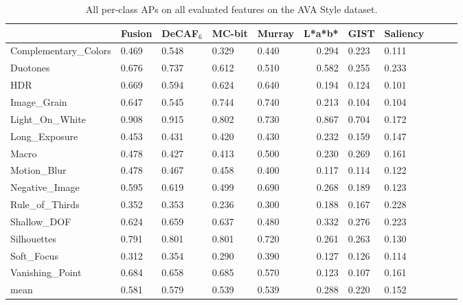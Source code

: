 \begin{table}[ht!]
\caption{
    All per-class APs on all evaluated features on the AVA Style dataset.
}\label{tab:ava_style_ap_table}
\vspace{1em}
\centering
\small{
\begin{tabular}{lllllrlllll}
\toprule
{}                    & Fusion & DeCAF$_6$ & MC-bit & Murray & L*a*b* & GIST  & Saliency \\
\midrule
Complementary\_Colors & 0.469  & 0.548     & 0.329  & 0.440  & 0.294  & 0.223 & 0.111 \\
Duotones              & 0.676  & 0.737     & 0.612  & 0.510  & 0.582  & 0.255 & 0.233 \\
HDR                   & 0.669  & 0.594     & 0.624  & 0.640  & 0.194  & 0.124 & 0.101 \\
Image\_Grain          & 0.647  & 0.545     & 0.744  & 0.740  & 0.213  & 0.104 & 0.104 \\
Light\_On\_White      & 0.908  & 0.915     & 0.802  & 0.730  & 0.867  & 0.704 & 0.172 \\
Long\_Exposure        & 0.453  & 0.431     & 0.420  & 0.430  & 0.232  & 0.159 & 0.147 \\
Macro                 & 0.478  & 0.427     & 0.413  & 0.500  & 0.230  & 0.269 & 0.161 \\
Motion\_Blur          & 0.478  & 0.467     & 0.458  & 0.400  & 0.117  & 0.114 & 0.122 \\
Negative\_Image       & 0.595  & 0.619     & 0.499  & 0.690  & 0.268  & 0.189 & 0.123 \\
Rule\_of\_Thirds      & 0.352  & 0.353     & 0.236  & 0.300  & 0.188  & 0.167 & 0.228 \\
Shallow\_DOF          & 0.624  & 0.659     & 0.637  & 0.480  & 0.332  & 0.276 & 0.223 \\
Silhouettes           & 0.791  & 0.801     & 0.801  & 0.720  & 0.261  & 0.263 & 0.130 \\
Soft\_Focus           & 0.312  & 0.354     & 0.290  & 0.390  & 0.127  & 0.126 & 0.114 \\
Vanishing\_Point      & 0.684  & 0.658     & 0.685  & 0.570  & 0.123  & 0.107 & 0.161 \\
\midrule
mean                  & 0.581  & 0.579     & 0.539  & 0.539  & 0.288  & 0.220 & 0.152 \\
\bottomrule
\end{tabular}

}
\end{table}

